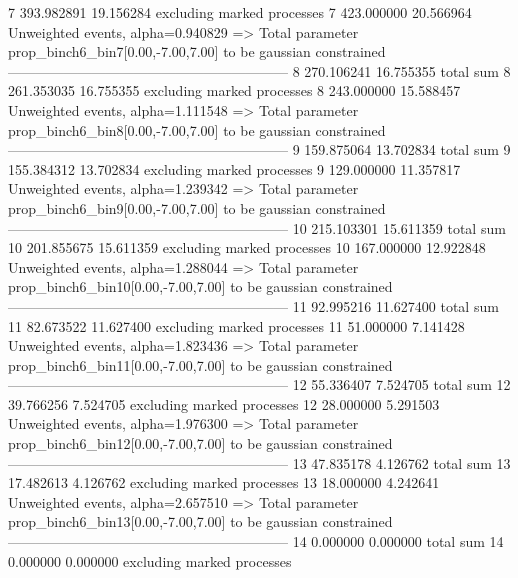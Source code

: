 7          393.982891      19.156284       excluding marked processes    
7          423.000000      20.566964       Unweighted events, alpha=0.940829
  => Total parameter prop_binch6_bin7[0.00,-7.00,7.00] to be gaussian constrained
------------------------------------------------------------
8          270.106241      16.755355       total sum                     
8          261.353035      16.755355       excluding marked processes    
8          243.000000      15.588457       Unweighted events, alpha=1.111548
  => Total parameter prop_binch6_bin8[0.00,-7.00,7.00] to be gaussian constrained
------------------------------------------------------------
9          159.875064      13.702834       total sum                     
9          155.384312      13.702834       excluding marked processes    
9          129.000000      11.357817       Unweighted events, alpha=1.239342
  => Total parameter prop_binch6_bin9[0.00,-7.00,7.00] to be gaussian constrained
------------------------------------------------------------
10         215.103301      15.611359       total sum                     
10         201.855675      15.611359       excluding marked processes    
10         167.000000      12.922848       Unweighted events, alpha=1.288044
  => Total parameter prop_binch6_bin10[0.00,-7.00,7.00] to be gaussian constrained
------------------------------------------------------------
11         92.995216       11.627400       total sum                     
11         82.673522       11.627400       excluding marked processes    
11         51.000000       7.141428        Unweighted events, alpha=1.823436
  => Total parameter prop_binch6_bin11[0.00,-7.00,7.00] to be gaussian constrained
------------------------------------------------------------
12         55.336407       7.524705        total sum                     
12         39.766256       7.524705        excluding marked processes    
12         28.000000       5.291503        Unweighted events, alpha=1.976300
  => Total parameter prop_binch6_bin12[0.00,-7.00,7.00] to be gaussian constrained
------------------------------------------------------------
13         47.835178       4.126762        total sum                     
13         17.482613       4.126762        excluding marked processes    
13         18.000000       4.242641        Unweighted events, alpha=2.657510
  => Total parameter prop_binch6_bin13[0.00,-7.00,7.00] to be gaussian constrained
------------------------------------------------------------
14         0.000000        0.000000        total sum                     
14         0.000000        0.000000        excluding marked processes    
